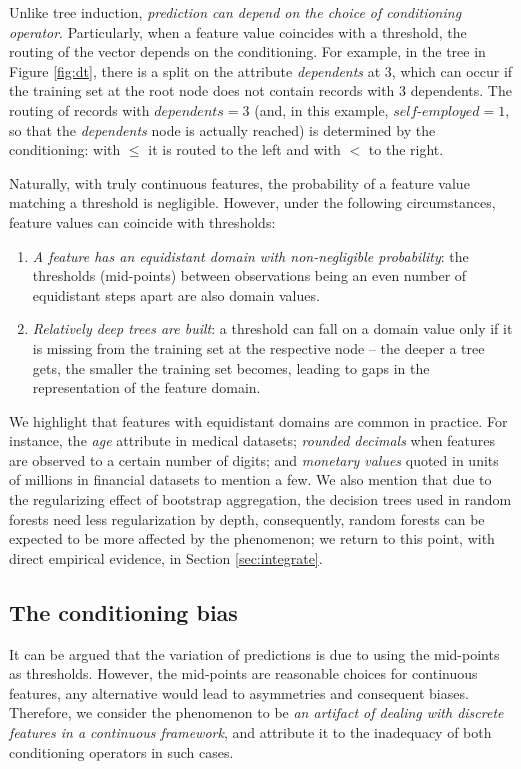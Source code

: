 \documentclass[5p,twocolumn,authoryear]{elsarticle}
\theoremstyle{plain}%
\theoremstyle{remark}%
\theoremstyle{definition}%
\begin{document}
Unlike tree induction, \emph{prediction can depend on the choice of conditioning operator}. Particularly, when a feature value coincides with a threshold, the routing of the vector depends on the conditioning.
For example, in the tree in Figure \ref{fig:dt}, there is a split on the attribute \emph{dependents} at 3, which can occur if the training set at the root node does not contain records with 3 dependents. The routing of records with $dependents=3$ (and, in this example, $self\text{-}employed=1$, so that the \emph{dependents} node is actually reached) is determined by the conditioning: with $\leq$ it is routed to the left and with $<$ to the right.

Naturally, with truly continuous features, the probability of a feature value matching a threshold is negligible. However, under the following circumstances, feature values can coincide with thresholds:
\begin{enumerate}
\item \emph{A feature has an equidistant domain with non-negligible probability}: the thresholds (mid-points) between observations being an even number of equidistant steps apart are also domain values.
\item \emph{Relatively deep trees are built}: a threshold can fall on a domain value only if it is missing from the training set at the respective node -- the deeper a tree gets, the smaller the training set becomes, leading to gaps in the representation of the feature domain.
\end{enumerate}
We highlight that features with equidistant domains are common in practice. For instance, the \emph{age} attribute in medical datasets; \emph{rounded decimals} when features are observed to a certain number of digits; and \emph{monetary values} quoted in units of millions in financial datasets to mention a few.
We also mention that due to the regularizing effect of bootstrap aggregation, the decision trees used in random forests need less regularization by depth, consequently, random forests can be expected to be more affected by the phenomenon; we return to this point, with direct empirical evidence, in Section \ref{sec:integrate}.

\subsection{The conditioning bias}
\label{sec:problem-bias}

It can be argued that the variation of predictions is due to using the mid-points as thresholds. However, the mid-points are reasonable choices for continuous features, any alternative would lead to asymmetries and consequent biases. Therefore, we consider the phenomenon to be \emph{an artifact of dealing with discrete features in a continuous framework}, and attribute it to the inadequacy of both conditioning operators in such cases.
\end{document}
